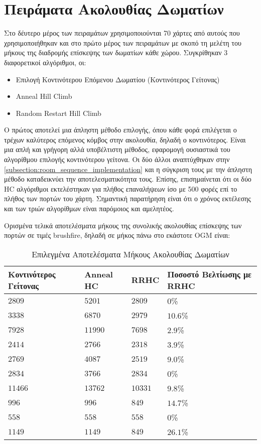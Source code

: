 \section{Πειράματα Ακολουθίας Δωματίων}
\label{sec:experiments_room_sequence}

Στο δέυτερο μέρος των πειραμάτων χρησιμοποιούνται 70 χάρτες από αυτούς που χρησιμοποιήθηκαν και στο πρώτο μέρος των πειραμάτων με σκοπό τη μελέτη του μήκους της διαδρομής επίσκεψης των δωματίων κάθε χώρου. Συγκρίθηκαν 3 διαφορετικοί αλγόριθμοι, οι:

\begin{itemize}
    \setlength\itemsep{-0.2em}
    \item Επιλογή Κοντινότερου Επόμενου Δωματίου (Κοντινότερος Γείτονας)
    \item Anneal Hill Climb
    \item Random Restart Hill Climb
\end{itemize}

Ο πρώτος αποτελεί μια άπληστη μέθοδο επιλογής, όπου κάθε φορά επιλέγεται ο τρέχων καλύτερος επόμενος κόμβος στην ακολουθία, δηλαδή ο κοντινότερος. Είναι μια απλή και γρήγορη αλλά υποβέλτιστη μέθοδος, εφαρομογή ουσιαστικά του αλγορίθμου επιλογής κοντινότερου γείτονα. Οι δύο άλλοι αναπτύχθηκαν στην \autoref{subsection:room_sequence_implementation} και η σύγκριση τους με την άπληστη μέθοδο καταδεικνύει την αποτελεσματικότητα τους. Επίσης, επισημαίνεται ότι οι δύο HC αλγόριθμοι εκτελέστηκαν για πλήθος επαναλήψεων ίσο με 500 φορές επί το πλήθος των πορτών του χάρτη. Σημαντική παρατήρηση είναι ότι ο χρόνος εκτέλεσης και των τριών αλγορίθμων είναι παρόμοιος και αμελητέος.


Ορισμένα τελικά αποτελέσματα μήκους της συνολικής ακολουθίας επίσκεψης των πορτών σε τιμές brushfire, δηλαδή σε μήκος πάνω στο εκάστοτε OGM είναι:


\begin{longtable}{| p{} | p{} | p{} | p{} |}

    \caption{Επιλεγμένα Αποτελέσματα Μήκους Ακολουθίας Δωματίων}
    \label{tab:room_sequence_results}
    \hline
    \rowcolor[gray]{0.8}
    Κοντινότερος Γείτονας & Anneal HC & RRHC & Ποσοστό Βελτίωσης με RRHC \\ \hline
    $2809$ & $5201$ & $2809$ & $0$\%\\ \hline
    $3338$ & $6870$ & $2979$ & $10.6$\%\\ \hline
    $7928$ & $11990$ & $7698$ & $2.9$\%\\ \hline
    $2414$ & $2766$ & $2318$ & $3.9$\%\\ \hline
    $2769$ & $4087$ & $2519$ & $9.0$\%\\ \hline
    $2834$ & $3766$ & $2834$ & $0$\%\\ \hline
    $11466$ & $13762$ & $10331$ & $9.8$\%\\ \hline
    $996$ & $996$ & $849$ & $14.7$\%\\ \hline
    $558$ & $558$ & $558$ & $0$\%\\ \hline
    $1149$ & $1149$ & $849$ & $26.1$\%\\ 
    \hline
\end{longtable}



